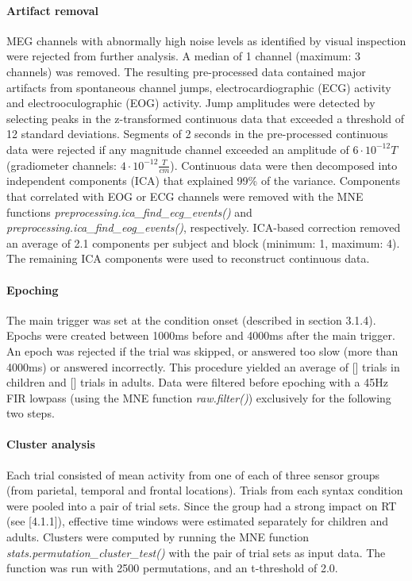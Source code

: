 \paragraph{Artifact removal}
MEG channels with abnormally high noise levels as identified by visual inspection were rejected from further analysis. A median of 1 channel (maximum: 3 channels) was removed.
The resulting pre-processed data contained major artifacts from spontaneous channel jumps, electrocardiographic (ECG) activity and electrooculographic (EOG) activity.
Jump amplitudes were detected by selecting peaks in the z-transformed continuous data that exceeded a threshold of 12 standard deviations.
Segments of 2 seconds in the pre-processed continuous data were rejected if any magnitude channel exceeded an amplitude of $6\cdot10^{-12}T$ (gradiometer channels: $4\cdot10^{-12}\frac{T}{cm}$).
Continuous data were then decomposed into independent components (ICA) that explained 99\% of the variance.
Components that correlated with EOG or ECG channels were removed with the MNE functions \emph{preprocessing.ica\_find\_ecg\_events()} and \emph{preprocessing.ica\_find\_eog\_events()}, respectively.
ICA-based correction removed an average of 2.1 components per subject and block (minimum: 1, maximum: 4).
The remaining ICA components were used to reconstruct continuous data.

\paragraph{Epoching}
The main trigger was set at the condition onset (described in section 3.1.4).
Epochs were created between 1000ms before and 4000ms after the main trigger.
An epoch was rejected if the trial was skipped, or answered too slow (more than 4000ms) or answered incorrectly.
This procedure yielded an average of [] trials in children and [] trials in adults.
Data were filtered before epoching with a 45Hz FIR lowpass (using the MNE function \emph{raw.filter()}) exclusively for the following two steps.

\paragraph{Cluster analysis}
Each trial consisted of mean activity from one of each of three sensor groups (from parietal, temporal and frontal locations).
Trials from each syntax condition were pooled into a pair of trial sets.
Since the group had a strong impact on RT (see [4.1.1]), effective time windows were estimated separately for children and adults.
Clusters were computed by running the MNE function \emph{stats.permutation\_cluster\_test()} \cite{3.3.clustertest} with the pair of trial sets as input data.
The function was run with 2500 permutations, and an t-threshold of 2.0.

